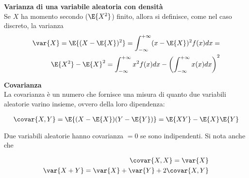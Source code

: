 \begin{defn}
    \textbf{Varianza di una variabile aleatoria con densità} \\
    Se $X$ ha momento secondo ($\E{X^2}$) finito, allora si definisce, come nel
    caso discreto, la varianza
    \begin{equation*}
        \begin{aligned}
            \var{X} = \E{(X - \E{X})^2} = \int_{-\infty}^{+\infty} (x - \E{X})^2 f(x) dx = \\
            \E{X^2} - \E{X}^2 = \int_{-\infty}^{+\infty} x^2 f(x) dx - \left(\int_{-\infty}^{+\infty} x (x) dx\right)^2
        \end{aligned}
    \end{equation*}
\end{defn}

\begin{defn}
    \textbf{Covarianza} \\
    La covarianza è un numero che fornisce una misura di quanto due variabili
    aleatorie varino insieme, ovvero della loro dipendenza:

    \begin{equation*}
        \begin{aligned}
            \covar{X,Y} = \E{(X  - \E{X})(Y - \E{Y})} = \E{XY} - \E{X}\E{Y}
        \end{aligned}
    \end{equation*}

    Due variabili aleatorie hanno covarianza $= 0$ se sono indipendenti. Si nota
    anche che

    \begin{equation*}
        \begin{aligned}
            \covar{X,X} = \var{X} \\
            \var{X + Y} = \var{X} + \var{Y} + 2\covar{X, Y}
        \end{aligned}
    \end{equation*}
\end{defn}

